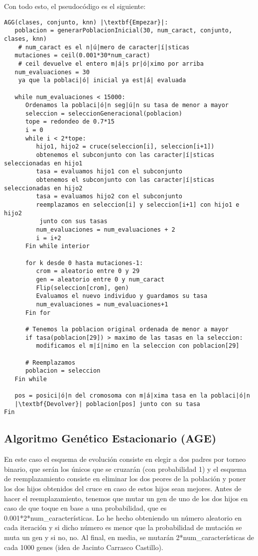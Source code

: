\documentclass[12pt]{article}
\begin{document}
Con todo esto, el pseudocódigo es el siguiente:
\begin{lstlisting}
AGG(clases, conjunto, knn) |\textbf{Empezar}|:
   poblacion = generarPoblacionInicial(30, num_caract, conjunto, clases, knn)
    # num_caract es el n|ú|mero de caracter|í|sticas
   mutaciones = ceil(0.001*30*num_caract)
    # ceil devuelve el entero m|á|s pr|ó|ximo por arriba
   num_evaluaciones = 30
    ya que la poblaci|ó| inicial ya est|á| evaluada
   
   while num_evaluaciones < 15000:
      Ordenamos la poblaci|ó|n seg|ú|n su tasa de menor a mayor
      seleccion = seleccionGeneracional(poblacion)
      tope = redondeo de 0.7*15
      i = 0
      while i < 2*tope:
         hijo1, hijo2 = cruce(seleccion[i], seleccion[i+1])
         obtenemos el subconjunto con las caracter|í|sticas seleccionadas en hijo1
         tasa = evaluamos hijo1 con el subconjunto
         obtenemos el subconjunto con las caracter|í|sticas seleccionadas en hijo2
         tasa = evaluamos hijo2 con el subconjunto
         reemplazamos en seleccion[i] y seleccion[i+1] con hijo1 e hijo2
          junto con sus tasas
         num_evaluaciones = num_evaluaciones + 2
         i = i+2
      Fin while interior
      
      for k desde 0 hasta mutaciones-1:
         crom = aleatorio entre 0 y 29
         gen = aleatorio entre 0 y num_caract
         Flip(seleccion[crom], gen)
         Evaluamos el nuevo individuo y guardamos su tasa
         num_evaluaciones = num_evaluaciones+1
      Fin for
      
      # Tenemos la poblacion original ordenada de menor a mayor
      if tasa(poblacion[29]) > maximo de las tasas en la seleccion:
         modificamos el m|í|nimo en la seleccion con poblacion[29]
      
      # Reemplazamos
      poblacion = seleccion
   Fin while
   
   pos = posici|ó|n del cromosoma con m|á|xima tasa en la poblaci|ó|n
   |\textbf{Devolver}| poblacion[pos] junto con su tasa
Fin

\end{lstlisting}


\subsection{Algoritmo Genético Estacionario (AGE)}
En este caso el esquema de evolución consiste en elegir a dos padres por torneo binario, que serán los únicos que se cruzarán (con probabilidad 1) y el esquema de reemplazamiento consiste en eliminar los dos peores de la población y poner los dos hijos obtenidos del cruce en caso de estos hijos sean mejores. Antes de hacer el reemplazamiento, tenemos que mutar un gen de uno de los dos hijos en caso de que toque en base a una probabilidad, que es 0.001*2*num\_características. Lo he hecho obteniendo un número aleatorio en cada iteración y si dicho número es menor que la probabilidad de mutación se muta un gen y si no, no. Al final, en media, se mutarán 2*num\_características de cada 1000 genes (idea de Jacinto Carrasco Castillo).
\end{document}
